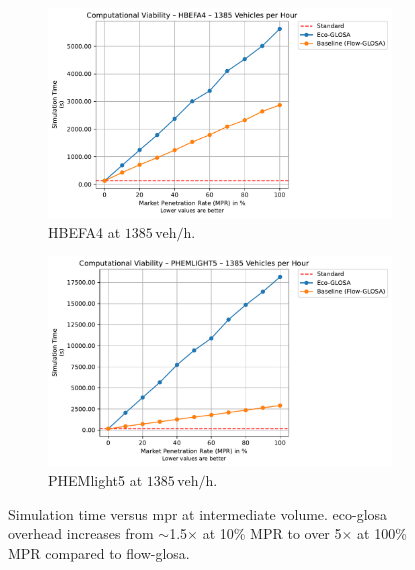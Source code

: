 \begin{figure}[htb]
  \centering
  \begin{subfigure}[b]{0.45\textwidth}
    \includegraphics[width=\textwidth]{data/img/ComputationalViability/ComputationalViability_HBEFA4_Cars1385.pdf}
    \caption{HBEFA4 at $1385\,\mathrm{veh/h}$.}
    \label{fig:Comp_1385_HBEFA4}
  \end{subfigure}\hfill
  \begin{subfigure}[b]{0.45\textwidth}
    \includegraphics[width=\textwidth]{data/img/ComputationalViability/ComputationalViability_PHEMLIGHT5_Cars1385.pdf}
    \caption{PHEMlight5 at $1385\,\mathrm{veh/h}$.}
    \label{fig:Comp_1385_PHEM}
  \end{subfigure}
  \caption{Simulation time versus \ac{mpr} at intermediate volume.  \ac{eco-glosa} overhead increases from $\sim$1.5$\times$ at 10\% MPR to over 5$\times$ at 100\% MPR compared to \ac{flow-glosa}.}
  \label{fig:Comp_1385}
\end{figure}

